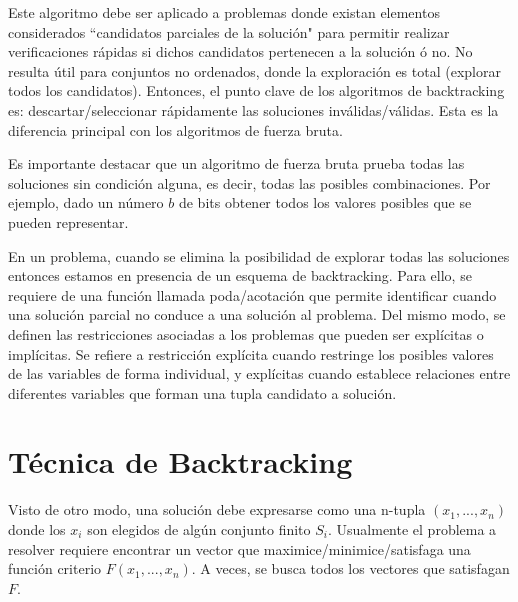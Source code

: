 Este algoritmo debe ser aplicado a problemas donde existan elementos considerados ``candidatos parciales de la solución" para permitir realizar verificaciones rápidas si dichos candidatos pertenecen a la solución ó no. No resulta útil para conjuntos no ordenados, donde la exploración es total (explorar todos los candidatos). Entonces, el punto clave de los algoritmos de backtracking es: descartar/seleccionar rápidamente las soluciones inválidas/válidas. Esta es la diferencia principal con los algoritmos de fuerza bruta.

Es importante destacar que un algoritmo de fuerza bruta prueba todas las soluciones sin condición alguna, es decir, todas las posibles combinaciones. Por ejemplo, dado un número $b$ de bits obtener todos los valores posibles que se pueden representar.

En un problema, cuando se elimina la posibilidad de explorar todas las soluciones entonces estamos en presencia de un esquema de backtracking. Para ello, se requiere de una función llamada poda/acotación que permite identificar cuando una solución parcial no conduce a una solución al problema. Del mismo modo, se definen las restricciones asociadas a los problemas que pueden ser explícitas o implícitas. Se refiere a restricción explícita cuando restringe los posibles valores de las variables de forma individual, y explícitas cuando establece relaciones entre diferentes variables que forman una tupla candidato a solución.

\section{Técnica de Backtracking}

Visto de otro modo, una solución debe expresarse como una n-tupla $(x_1, ..., x_n)$ donde los $x_i$ son elegidos de algún conjunto finito $S_i$. Usualmente el problema a resolver requiere encontrar un vector que maximice/minimice/satisfaga una función criterio $F(x_1,...,x_n)$. A veces, se busca todos los vectores que satisfagan $F$. 


